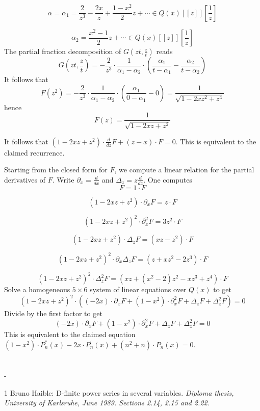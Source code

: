 \documentclass[12pt,a4paper,oneside,onecolumn]{article}
\makeatletter
\newenvironment{lyxsectionbibliography}
{
\section*{\refname}
\@mkboth{\uppercase{\refname}}{\uppercase{\refname}}
\begin{list}{}{
\itemindent-\leftmargin
\labelsep 0pt
\renewcommand{\makelabel}{}
}
}
{\end{list}}
\makeatother
\begin{document}
\[
\alpha =\alpha _{1}=\frac{2}{z^{3}}-\frac{2x}{z}+\frac{1-x^{2}}{2}z+\cdots \in Q(x)[[z]][\frac{1}{z}]\]

\[
\alpha _{2}=\frac{x^{2}-1}{2}z+\cdots \in Q(x)[[z]][\frac{1}{z}]\]
The partial fraction decomposition of  \( G(zt,\frac{z}{t}) \) reads
\[
G(zt,\frac{z}{t})=-\frac{2}{z^{3}}\cdot \frac{1}{\alpha _{1}-\alpha _{2}}\cdot \left( \frac{\alpha _{1}}{t-\alpha _{1}}-\frac{\alpha _{2}}{t-\alpha _{2}}\right) \]
It follows
that
\[
F(z^{2})=-\frac{2}{z^{3}}\cdot \frac{1}{\alpha _{1}-\alpha _{2}}\cdot \left( \frac{\alpha _{1}}{0-\alpha _{1}}-0\right) =\frac{1}{\sqrt{1-2xz^{2}+z^{4}}}\]
hence
\[
F(z)=\frac{1}{\sqrt{1-2xz+z^{2}}}\]


It follows that  \( (1-2xz+z^{2})\cdot \frac{d}{dz}F+(z-x)\cdot F=0 \). This is equivalent to the claimed recurrence.

Starting from the closed form for  \( F \), we compute a linear relation
for the partial derivatives of  \( F \). Write  \( \partial _{x}=\frac{d}{dx} \) and  \( \Delta _{z}=z\frac{d}{dz} \). One computes
\[
F=1\cdot F\]

\[
\left( 1-2xz+z^{2}\right) \cdot \partial _{x}F=z\cdot F\]

\[
\left( 1-2xz+z^{2}\right) ^{2}\cdot \partial _{x}^{2}F=3z^{2}\cdot F\]

\[
\left( 1-2xz+z^{2}\right) \cdot \Delta _{z}F=(xz-z^{2})\cdot F\]

\[
\left( 1-2xz+z^{2}\right) ^{2}\cdot \partial _{x}\Delta _{z}F=(z+xz^{2}-2z^{3})\cdot F\]

\[
\left( 1-2xz+z^{2}\right) ^{2}\cdot \Delta _{z}^{2}F=\left( xz+(x^{2}-2)z^{2}-xz^{3}+z^{4}\right) \cdot F\]
Solve
a homogeneous  \( 5\times 6 \) system of linear equations over  \( Q(x) \) to get 
\[
\left( 1-2xz+z^{2}\right) ^{2}\cdot \left( (-2x)\cdot \partial _{x}F+(1-x^{2})\cdot \partial _{x}^{2}F+\Delta _{z}F+\Delta _{z}^{2}F\right) =0\]
Divide by
the first factor to get
\[
(-2x)\cdot \partial _{x}F+(1-x^{2})\cdot \partial _{x}^{2}F+\Delta _{z}F+\Delta _{z}^{2}F=0\]
This is equivalent to the claimed equation
 \( (1-x^{2})\cdot P_{n}^{''}(x)-2x\cdot P_{n}^{'}(x)+(n^{2}+n)\cdot P_{n}(x)=0 \).

\begin{lyxsectionbibliography}

\item [1] Bruno Haible: D-finite power series in several variables. \em Diploma
thesis, University of Karlsruhe, June 1989\em . Sections 2.14, 2.15
and 2.22.

\end{lyxsectionbibliography}
\end{document}
